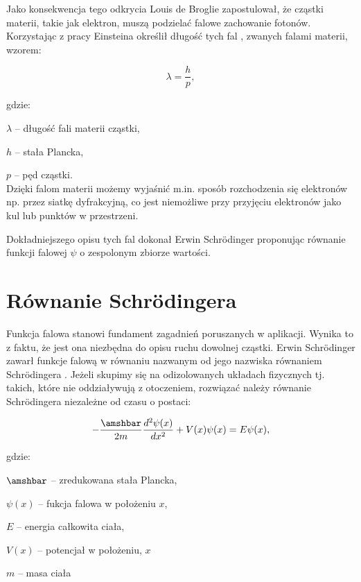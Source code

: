\documentclass{SGGW-thesis}
\begin{document}
	 Jako konsekwencja tego odkrycia Louis de Broglie zapostulował, że cząstki materii, takie jak elektron, muszą podzielać falowe zachowanie fotonów. Korzystając z pracy Einsteina określił długość tych fal \cite{matter-wave}, zwanych falami materii, wzorem:
	 
	 \begin{equation}
	 \lambda=\frac{h}{p},
	 \end{equation}
	
	 
	 gdzie:
	 
	 $\lambda$ -- długość fali materii cząstki,
	 
	 $h$ -- stała Plancka,
	 
	 $p$ -- pęd cząstki.\\
	 
	 Dzięki falom materii możemy wyjaśnić m.in. sposób rozchodzenia się elektronów np. przez siatkę dyfrakcyjną, co jest niemożliwe przy przyjęciu elektronów jako kul lub punktów w przestrzeni.
	 
	 Dokładniejszego opisu tych fal dokonał Erwin Schrödinger proponując równanie funkcji falowej $\psi$ o zespolonym zbiorze wartości. 
	 
	\section{Równanie Schrödingera}
	Funkcja falowa stanowi fundament zagadnień poruszanych w aplikacji. Wynika to z faktu, że jest ona niezbędna do opisu ruchu dowolnej cząstki. Erwin Schrödinger zawarł funkcje falową w równaniu nazwanym od jego nazwiska równaniem Schrödingera \cite{schrodinger-equation}.  Jeżeli skupimy się na odizolowanych układach fizycznych tj. takich, które nie oddziaływują z otoczeniem, rozwiązać należy równanie Schrödingera niezależne od czasu o postaci:
	\begin{center}
	\begin{equation}
		-\frac{\amshbar}{2m} \frac{d^2\psi(x)}{dx^2} + V(x)\psi(x) = E\psi(x),
	\end{equation}
	\end{center}
	gdzie:
	
	$\amshbar$ -- zredukowana stała Plancka,
	
	$\psi(x)$ -- fukcja falowa w położeniu $x$,
	
	$E$ -- energia całkowita ciała,
	
	$V(x)$ -- potencjał w położeniu, $x$
	
	$m$ -- masa ciała\\
	
\end{document}
